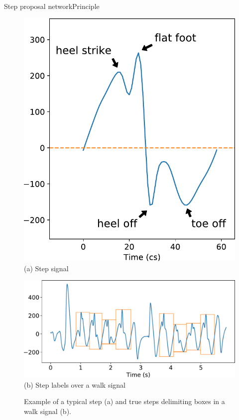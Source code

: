 \documentclass[9pt,t,aspectratio=1610]{beamer}
\begin{document}
\begin{frame}{Step proposal network}{Principle}
\begin{figure}[h]
    \centering
    \begin{minipage}[t]{0.45\linewidth}
        \centering
        \includegraphics[width=0.6\linewidth]{example_step.pdf}\\
        {\small (a)\; Step signal}
    \end{minipage}\hfill
    \begin{minipage}[t]{0.55\linewidth}
        \centering
        \includegraphics[width=\linewidth]{signal_walk_young_female_stepboxes.pdf}\\
        {\small (b)\; Step labels over a walk signal}
    \end{minipage}
    \caption{Example of a typical step (a) and true steps delimiting boxes in a walk signal (b).}
    \label{fig:walk_class_ex_stepboxes}
\end{figure}
\end{frame}
\end{document}
